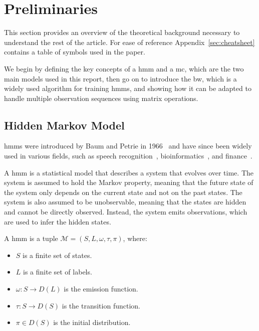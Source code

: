 \section{Preliminaries}\label{sec:preliminaries}
This section provides an overview of the theoretical background necessary to understand the rest of the article.
For ease of reference Appendix~\ref{sec:cheatsheet} contains a table of symbols used in the paper.

We begin by defining the key concepts of a \gls{hmm} and a \gls{mc}, which are the two main models used in this report, then go on to introduce the \gls{bw}, which is a widely used algorithm for training \glspl{hmm}, and showing how it can be adapted to handle multiple observation sequences using matrix operations.

\subsection{Hidden Markov Model}\label{subsec:hmm}
\glspl{hmm} were introduced by Baum and Petrie in 1966~\cite{baum1966statistical} and have since been widely used in various fields, such as speech recognition~\cite{chavan2013overview}, bioinformatics~\cite{ciocchetta2009bio}, and finance~\cite{mamon2007hidden}.

A \gls{hmm} is a statistical model that describes a system that evolves over time.
The system is assumed to hold the Markov property, meaning that the future state of the system only depends on the current state and not on the past states.
The system is also assumed to be unobservable, meaning that the states are hidden and cannot be directly observed.
Instead, the system emits observations, which are used to infer the hidden states.


\begin{definition}
    A \gls{hmm} is a tuple $\mathcal{M} = (S, L, \omega, \tau, \pi)$, where:
    \begin{itemize}
        \item $S$ is a finite set of states.
        \item $L$ is a finite set of labels.
        \item $\omega: S \rightarrow D(L)$ is the emission function.
        \item $\tau: S \rightarrow D(S)$ is the transition function.
        \item $\pi \in D(S)$ is the initial distribution.
    \end{itemize}
\end{definition}


